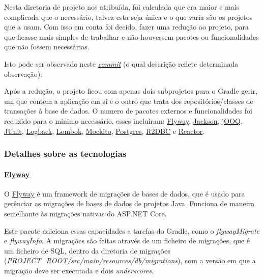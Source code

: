 Nesta diretoria de projeto nos atribuída, foi calculada que era maior e mais complicada que o necessário, talvez esta seja única e o que varia são os projetos que a usam. Com isso em conta foi decido, fazer uma redução ao projeto, para que ficasse mais simples de trabalhar e não houvessem pacotes ou funcionalidades que não fossem necessárias.

Isto pode ser observado neste \href{https://github.com/CatKinKitKat/MicronautJooqPostgresREST/commit/3c71d709599662436ae13cf9dcf609a5ca5464e3}{\textit{commit}} (o qual descrição reflete determinada observação).

Após a redução, o projeto ficou com apenas dois subprojetos para o Gradle gerir, um que contem a aplicação em sí e o outro que trata dos repositórios/classes de transações à base de dados. O numero de pacotes externos e funcionalidades foi reduzido para o mínimo necessário, esses incluíram: \href{https://flywaydb.org/}{Flyway}, \href{http://fasterxml.com/}{Jackson}, \href{https://www.jooq.org/}{jOOQ}, \href{https://junit.org/junit5/}{JUnit}, \href{https://logback.qos.ch/}{Logback}, \href{https://projectlombok.org/}{Lombok}, \href{https://site.mockito.org/}{Mockito}, \href{https://jdbc.postgresql.org/}{Postgres}, \href{https://r2dbc.io/}{R2DBC} e \href{https://projectreactor.io/}{Reactor}.

\subsubsection{Detalhes sobre as tecnologias}

\paragraph{\href{https://flywaydb.org/}{Flyway}\\}

O \href{https://flywaydb.org/}{Flyway} é um framework de migrações de bases de dados, que é usado para gerênciar as migrações de bases de dados de projetos Java. Funciona de maneira semelhante às migrações nativas do ASP.NET Core. \cite{flyway}

Este pacote adiciona essas capacidades a tarefas do Gradle, como o \textit{flywayMigrate} e \textit{flywayInfo}. A migrações são feitas através de um ficheiro de migrações, que é um ficheiro de SQL, dentro da diretoria de migrações (\textit{PROJECT\_ROOT/src/main/resources/db/migrations}), com a versão em que a migração deve ser executada e dois \textit{underscores}.

